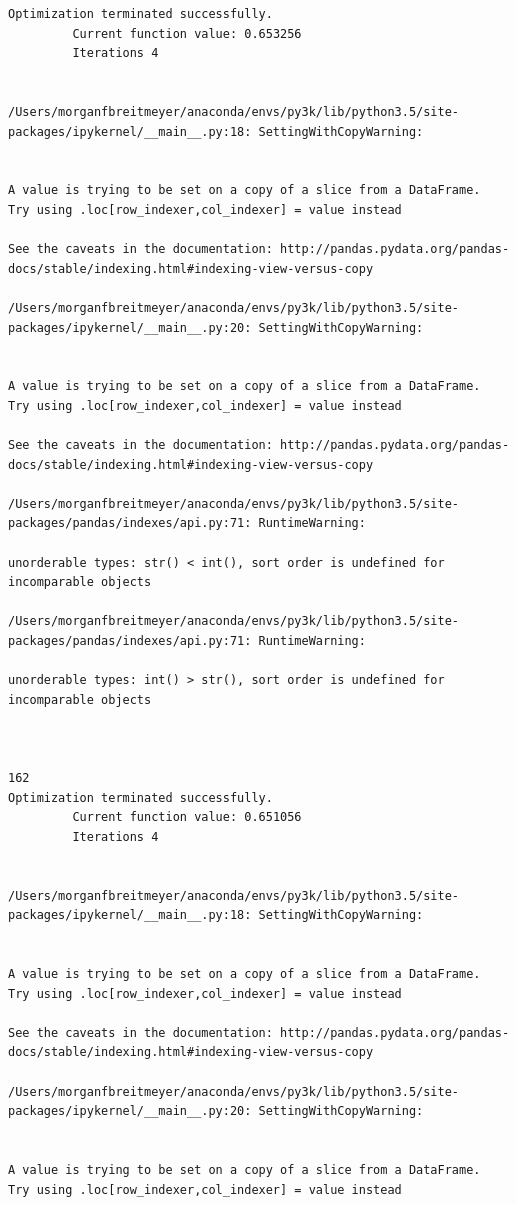 \begin{lstlisting}
Optimization terminated successfully.
         Current function value: 0.653256
         Iterations 4


/Users/morganfbreitmeyer/anaconda/envs/py3k/lib/python3.5/site-packages/ipykernel/__main__.py:18: SettingWithCopyWarning:


A value is trying to be set on a copy of a slice from a DataFrame.
Try using .loc[row_indexer,col_indexer] = value instead

See the caveats in the documentation: http://pandas.pydata.org/pandas-docs/stable/indexing.html#indexing-view-versus-copy

/Users/morganfbreitmeyer/anaconda/envs/py3k/lib/python3.5/site-packages/ipykernel/__main__.py:20: SettingWithCopyWarning:


A value is trying to be set on a copy of a slice from a DataFrame.
Try using .loc[row_indexer,col_indexer] = value instead

See the caveats in the documentation: http://pandas.pydata.org/pandas-docs/stable/indexing.html#indexing-view-versus-copy

/Users/morganfbreitmeyer/anaconda/envs/py3k/lib/python3.5/site-packages/pandas/indexes/api.py:71: RuntimeWarning:

unorderable types: str() < int(), sort order is undefined for incomparable objects

/Users/morganfbreitmeyer/anaconda/envs/py3k/lib/python3.5/site-packages/pandas/indexes/api.py:71: RuntimeWarning:

unorderable types: int() > str(), sort order is undefined for incomparable objects



162
Optimization terminated successfully.
         Current function value: 0.651056
         Iterations 4


/Users/morganfbreitmeyer/anaconda/envs/py3k/lib/python3.5/site-packages/ipykernel/__main__.py:18: SettingWithCopyWarning:


A value is trying to be set on a copy of a slice from a DataFrame.
Try using .loc[row_indexer,col_indexer] = value instead

See the caveats in the documentation: http://pandas.pydata.org/pandas-docs/stable/indexing.html#indexing-view-versus-copy

/Users/morganfbreitmeyer/anaconda/envs/py3k/lib/python3.5/site-packages/ipykernel/__main__.py:20: SettingWithCopyWarning:


A value is trying to be set on a copy of a slice from a DataFrame.
Try using .loc[row_indexer,col_indexer] = value instead


\end{lstlisting}
